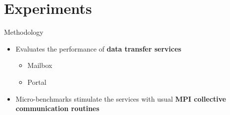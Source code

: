 \section{Experiments}

	\begin{frame}[fragile]{Methodology}
		\begin{itemize}
			\item Evaluates the performance of \textbf{data transfer services}
			\begin{itemize}
				\item Mailbox
				\item Portal
			\end{itemize}
			\item Micro-benchmarks stimulate the services with usual \textbf{MPI collective communication routines}
		\end{itemize}

	\end{frame}

